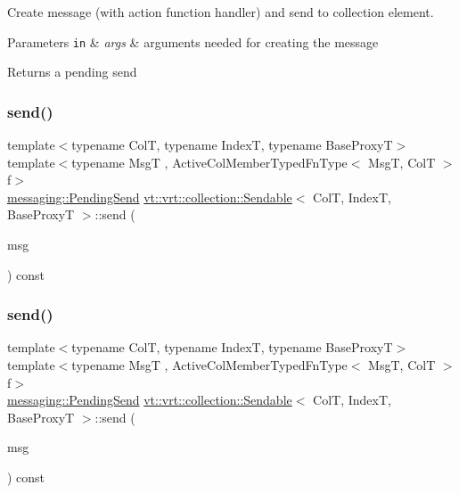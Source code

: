 Create message (with action function handler) and send to collection element. 


\begin{DoxyParams}[1]{Parameters}
\mbox{\tt in}  & {\em args} & arguments needed for creating the message\\
\hline
\end{DoxyParams}
\begin{DoxyReturn}{Returns}
a pending send 
\end{DoxyReturn}
\mbox{\label{structvt_1_1vrt_1_1collection_1_1_sendable_a321d85ceafaf6525875fb7468a80ac6d}} 
\subsubsection{\texorpdfstring{send()}{send()}\hspace{0.1cm}{\footnotesize\ttfamily [4/7]}}
{\footnotesize\ttfamily template$<$typename ColT, typename IndexT, typename Base\+ProxyT$>$ \\
template$<$typename MsgT , Active\+Col\+Member\+Typed\+Fn\+Type$<$ Msg\+T, Col\+T $>$ f$>$ \\
\hyperlink{structvt_1_1messaging_1_1_pending_send}{messaging\+::\+Pending\+Send} \hyperlink{structvt_1_1vrt_1_1collection_1_1_sendable}{vt\+::vrt\+::collection\+::\+Sendable}$<$ ColT, IndexT, Base\+ProxyT $>$\+::send (\begin{DoxyParamCaption}\item[{MsgT $\ast$}]{msg }\end{DoxyParamCaption}) const}

\mbox{\label{structvt_1_1vrt_1_1collection_1_1_sendable_aa8c102820895d01422c14e8c0993fc90}} 
\subsubsection{\texorpdfstring{send()}{send()}\hspace{0.1cm}{\footnotesize\ttfamily [5/7]}}
{\footnotesize\ttfamily template$<$typename ColT, typename IndexT, typename Base\+ProxyT$>$ \\
template$<$typename MsgT , Active\+Col\+Member\+Typed\+Fn\+Type$<$ Msg\+T, Col\+T $>$ f$>$ \\
\hyperlink{structvt_1_1messaging_1_1_pending_send}{messaging\+::\+Pending\+Send} \hyperlink{structvt_1_1vrt_1_1collection_1_1_sendable}{vt\+::vrt\+::collection\+::\+Sendable}$<$ ColT, IndexT, Base\+ProxyT $>$\+::send (\begin{DoxyParamCaption}\item[{\hyperlink{namespacevt_ab2b3d506ec8e8d1540aede826d84a239}{Msg\+Shared\+Ptr}$<$ MsgT $>$}]{msg }\end{DoxyParamCaption}) const}

